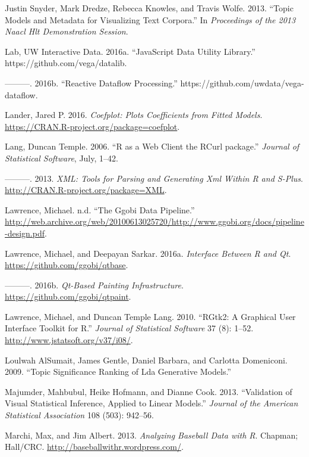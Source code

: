 \documentclass[12pt,]{isuthesis}
\begin{document}
\hypertarget{ref-Snyder}{}
Justin Snyder, Mark Dredze, Rebecca Knowles, and Travis Wolfe. 2013.
``Topic Models and Metadata for Visualizing Text Corpora.'' In
\emph{Proceedings of the 2013 Naacl Hlt Demonstration Session}.

\hypertarget{ref-datalib}{}
Lab, UW Interactive Data. 2016a. ``JavaScript Data Utility Library.''
https://github.com/vega/datalib.

\hypertarget{ref-vega-dataflow}{}
---------. 2016b. ``Reactive Dataflow Processing.''
https://github.com/uwdata/vega-dataflow.

\hypertarget{ref-coefplot}{}
Lander, Jared P. 2016. \emph{Coefplot: Plots Coefficients from Fitted
Models}. \url{https://CRAN.R-project.org/package=coefplot}.

\hypertarget{ref-Lang:2006us}{}
Lang, Duncan Temple. 2006. ``R as a Web Client the RCurl package.''
\emph{Journal of Statistical Software}, July, 1--42.

\hypertarget{ref-XML}{}
---------. 2013. \emph{XML: Tools for Parsing and Generating Xml Within
R and S-Plus}. \url{http://CRAN.R-project.org/package=XML}.

\hypertarget{ref-ggobi-pipeline-design}{}
Lawrence, Michael. n.d. ``The Ggobi Data Pipeline.''
\url{http://web.archive.org/web/20100613025720/http://www.ggobi.org/docs/pipeline-design.pdf}.

\hypertarget{ref-qtbase}{}
Lawrence, Michael, and Deepayan Sarkar. 2016a. \emph{Interface Between R
and Qt}. \url{https://github.com/ggobi/qtbase}.

\hypertarget{ref-qtpaint}{}
---------. 2016b. \emph{Qt-Based Painting Infrastructure}.
\url{https://github.com/ggobi/qtpaint}.

\hypertarget{ref-RGtk2}{}
Lawrence, Michael, and Duncan Temple Lang. 2010. ``RGtk2: A Graphical
User Interface Toolkit for R.'' \emph{Journal of Statistical Software}
37 (8): 1--52. \url{http://www.jstatsoft.org/v37/i08/}.

\hypertarget{ref-AlSumait}{}
Loulwah AlSumait, James Gentle, Daniel Barbara, and Carlotta Domeniconi.
2009. ``Topic Significance Ranking of Lda Generative Models.''

\hypertarget{ref-Majumder:2013ie}{}
Majumder, Mahbubul, Heike Hofmann, and Dianne Cook. 2013. ``Validation
of Visual Statistical Inference, Applied to Linear Models.''
\emph{Journal of the American Statistical Association} 108 (503):
942--56.

\hypertarget{ref-baseball}{}
Marchi, Max, and Jim Albert. 2013. \emph{Analyzing Baseball Data with
R}. Chapman; Hall/CRC. \url{http://baseballwithr.wordpress.com/}.
\end{document}
